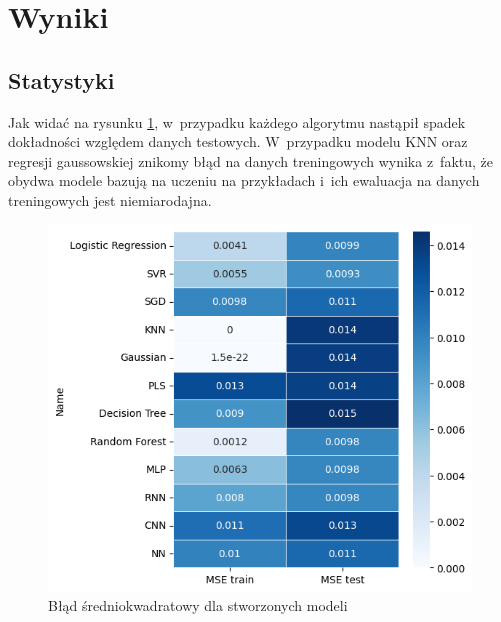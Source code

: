 

\section{Wyniki}

\subsection{Statystyki}

Jak widać na rysunku \ref{mse}, w~przypadku każdego algorytmu nastąpił
spadek dokładności względem danych testowych. W~przypadku modelu KNN oraz
regresji gaussowskiej znikomy błąd na danych treningowych wynika z~faktu, 
że obydwa modele bazują na uczeniu na przykładach i~ich ewaluacja na 
danych treningowych jest niemiarodajna. 

\begin{figure}[H]
    \centering
    \includegraphics[width=\textwidth]{images/mse.png}
    \caption{Błąd średniokwadratowy dla stworzonych modeli}
    \label{mse}
\end{figure}

